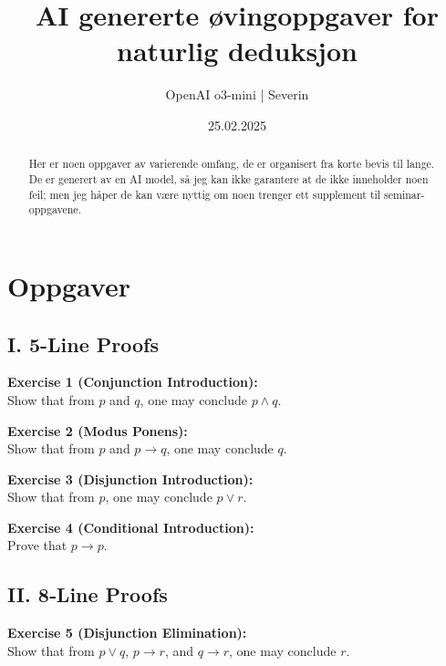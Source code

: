 \documentclass[12pt]{article}
\begin{document}
\title{AI genererte øvingoppgaver for naturlig deduksjon}
\author{OpenAI o3-mini | Severin}
\date{25.02.2025}
\maketitle

\begin{abstract}
    Her er noen oppgaver av varierende omfang, de er organisert fra korte bevis til lange. De er generert av en AI model, så jeg kan ikke garantere at de ikke inneholder noen feil; men jeg håper de kan være nyttig om noen trenger ett supplement til seminar-oppgavene.
\end{abstract}


\tableofcontents
\pagebreak

\section{Oppgaver}
\subsection{I. 5-Line Proofs}

\bigskip
\textbf{Exercise 1 (Conjunction Introduction):}\\[0.3em]
Show that from \(p\) and \(q\), one may conclude \(p\land q\). 

\bigskip
\textbf{Exercise 2 (Modus Ponens):}\\[0.3em]
Show that from \(p\) and \(p\to q\), one may conclude \(q\).


\bigskip
\textbf{Exercise 3 (Disjunction Introduction):}\\[0.3em]
Show that from \(p\), one may conclude \(p\lor r\).


\bigskip
\textbf{Exercise 4 (Conditional Introduction):}\\[0.3em]
Prove that \(p\to p\).


\pagebreak
\subsection{II. 8‐Line Proofs}

\bigskip
\textbf{Exercise 5 (Disjunction Elimination):}\\[0.3em]
Show that from \(p\lor q\), \(p\to r\), and \(q\to r\), one may conclude \(r\).
\end{document}
